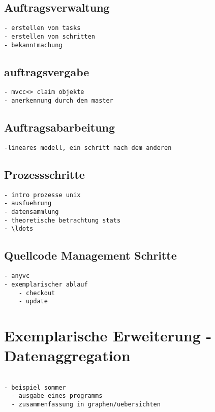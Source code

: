 \subsection{Auftragsverwaltung}

\begin{verbatim}
- erstellen von tasks
- erstellen von schritten
- bekanntmachung
\end{verbatim}

\subsection{auftragsvergabe}

\begin{verbatim}
- mvcc<> claim objekte
- anerkennung durch den master

\end{verbatim}

\subsection{Auftragsabarbeitung}
\begin{verbatim}
-lineares modell, ein schritt nach dem anderen
\end{verbatim}

\subsection{Prozessschritte}

\begin{verbatim}
- intro prozesse unix
- ausfuehrung
- datensammlung
- theoretische betrachtung stats
- \ldots
\end{verbatim}

\subsection{Quellcode Management Schritte}


\begin{verbatim}
- anyvc
- exemplarischer ablauf
    - checkout
    - update
\end{verbatim}

\section{Exemplarische Erweiterung - Datenaggregation}

 
\begin{verbatim}

- beispiel sommer
  - ausgabe eines programms
  - zusammenfassung in graphen/uebersichten

\end{verbatim}

